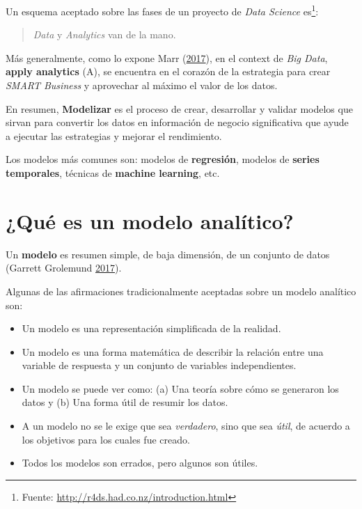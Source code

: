 \documentclass[]{book}
\providecommand{\tightlist}{%
  \setlength{\itemsep}{0pt}\setlength{\parskip}{0pt}}
\let\rmarkdownfootnote\footnote%
\def\footnote{\protect\rmarkdownfootnote}
\begin{document}
Un esquema aceptado sobre las fases de un proyecto de \emph{Data Science} es\footnote{Fuente: \url{http://r4ds.had.co.nz/introduction.html}}:

\begin{quote}
\emph{Data} y \emph{Analytics} van de la mano.
\end{quote}

Más generalmente, como lo expone Marr (\protect\hyperlink{ref-mar2015}{2017}), en el context de \emph{Big Data}, \textbf{apply analytics} (A), se encuentra en el corazón de la estrategia para crear \emph{SMART Business} y aprovechar al máximo el valor de los datos.

En resumen, \textbf{Modelizar} es el proceso de crear, desarrollar y validar modelos que sirvan para convertir los datos en información de negocio significativa que ayude a ejecutar las estrategias y mejorar el rendimiento.

Los modelos más comunes son: modelos de \textbf{regresión}, modelos de \textbf{series temporales}, técnicas de \textbf{machine learning}, etc.

\hypertarget{que-es-un-modelo-analitico}{%
\section{¿Qué es un modelo analítico?}\label{que-es-un-modelo-analitico}}

Un \textbf{modelo} es resumen simple, de baja dimensión, de un conjunto de datos (Garrett Grolemund \protect\hyperlink{ref-rdc2017}{2017}).

Algunas de las afirmaciones tradicionalmente aceptadas sobre un modelo analítico son:

\begin{itemize}
\tightlist
\item
  Un modelo es una representación simplificada de la realidad.
\item
  Un modelo es una forma matemática de describir la relación entre una variable de respuesta y un conjunto de variables independientes.
\item
  Un modelo se puede ver como: (a) Una teoría sobre cómo se generaron los datos y (b) Una forma útil de resumir los datos.
\item
  A un modelo no se le exige que sea \emph{verdadero}, sino que sea \emph{útil}, de acuerdo a los objetivos para los cuales fue creado.
\item
  Todos los modelos son errados, pero algunos son útiles.
\end{itemize}
\end{document}
